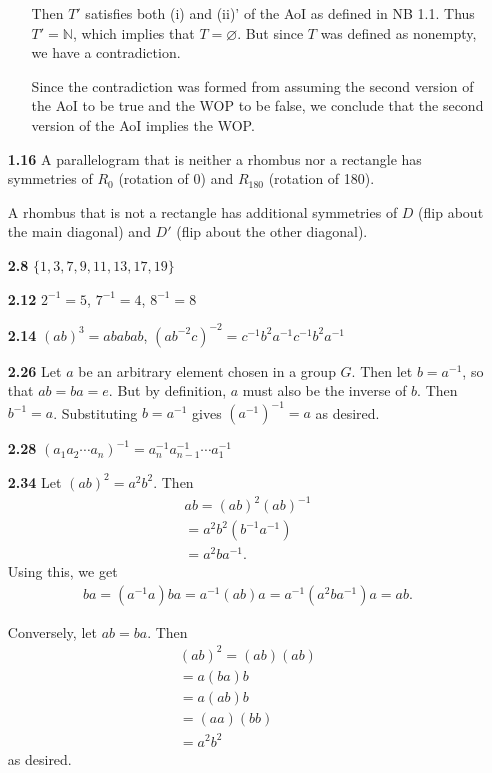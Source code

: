 \documentclass[11pt,letterpaper]{article}
\newcommand{\N}{\mathbb{N}}
\begin{document}
\begin{enumerate}
\begin{enumerate}
        Then $T'$ satisfies both (i) and (ii)' of the AoI as defined in NB 1.1. Thus $T'=\N$, which implies that $T={\varnothing}$. But since $T$ was defined as nonempty, we have a contradiction.

        Since the contradiction was formed from assuming the second version of the AoI to be true and the WOP to be false, we conclude that the second version of the AoI implies the WOP. \qedsymbol{}
    \end{enumerate}
\item[\textbf{1.16}] A parallelogram that is neither a rhombus nor a rectangle has symmetries of $R_0$ (rotation of 0\textdegree{}) and $R_{180}$ (rotation of 180\textdegree{}). 

A rhombus that is not a rectangle has additional symmetries of $D$ (flip about the main diagonal) and $D'$ (flip about the other diagonal).
\item[\textbf{2.8}] $\{1,3,7,9,11,13,17,19\}$
\item[\textbf{2.12}] $2^{-1}=5$, $7^{-1}=4$, $8^{-1}=8$
\item[\textbf{2.14}] $(ab)^3=ababab$, $(ab^{-2}c)^{-2}=c^{-1}b^{2}a^{-1}c^{-1}b^{2}a^{-1}$
\item[\textbf{2.26}] Let $a$ be an arbitrary element chosen in a group $G$. Then let $b=a^{-1}$, so that $ab=ba=e$. But by definition, $a$ must also be the inverse of $b$. Then $b^{-1}=a$. Substituting $b=a^{-1}$ gives $(a^{-1})^{-1}=a$ as desired. \qedsymbol{}
\item[\textbf{2.28}] $(a_1a_2\cdots a_n)^{-1}=a_n^{-1}a_{n-1}^{-1}\cdots a_1^{-1}$
\item[\textbf{2.34}] Let $(ab)^2=a^2b^2$. Then
    \begin{align*}
    ab = (ab)^2(ab)^{-1} \\
    = a^2b^2(b^{-1}a^{-1}) \\
    = a^2ba^{-1}.
    \end{align*}
    Using this, we get
    \begin{align*}
    ba = (a^{-1}a)ba
    = a^{-1}(ab)a
    = a^{-1}(a^2ba^{-1})a
    = ab.
    \end{align*}

    Conversely, let $ab=ba$. Then
    \begin{align*}
    (ab)^2 = (ab)(ab) \\
    = a(ba)b \\
    = a(ab)b \\
    = (aa)(bb) \\
    = a^2b^2
    \end{align*}
    as desired. \qedsymbol{}
\end{enumerate}
\end{document}
